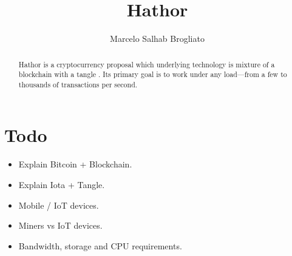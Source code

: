 \documentclass[12pt]{article}
\title{Hathor}
\author{Marcelo Salhab Brogliato}
\begin{document}
\maketitle

\begin{abstract}
Hathor is a cryptocurrency proposal which underlying technology is mixture of a blockchain \citep{nakamoto2008bitcoin} with a tangle \citep{tangle2016}. Its primary goal is to work under any load---from a few to thousands of transactions per second.
\end{abstract}



\section{Todo}


\begin{itemize}
\item Explain Bitcoin + Blockchain.
\item Explain Iota + Tangle.
\item Mobile / IoT devices.
\item Miners vs IoT devices.
\item Bandwidth, storage and CPU requirements.
\end{itemize}


\medskip



\end{document}
